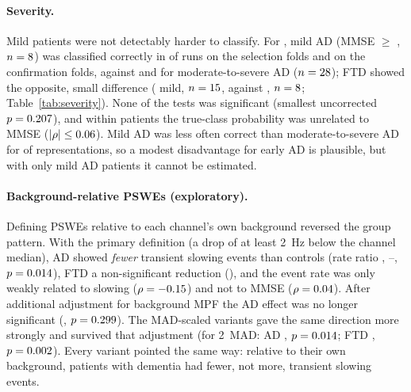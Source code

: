 \paragraph{Severity.} Mild patients were not detectably harder to classify. For \bestCell{}, mild AD
(MMSE $\ge$ \sevMildMin{}, $n=8$) was classified correctly in \sevSelADMildCorrect{} of runs on the
selection folds and \sevConfADMildCorrect{} on the confirmation folds, against \sevSelADModCorrect{} and
\sevConfADModCorrect{} for moderate-to-severe AD ($n=28$); FTD showed the opposite, small difference
(\sevSelFTDMildCorrect{} mild, $n=15$, against \sevSelFTDModCorrect{}, $n=8$;
Table~\ref{tab:severity}). None of the \sevNTests{} tests was significant (smallest uncorrected $p=0.207$),
and within patients the true-class probability was unrelated to MMSE ($|\rho|\le0.06$). Mild AD was
less often correct than moderate-to-severe AD for \sevRepADNMildWorse{} of \sevRepADNReps{} representations,
so a modest disadvantage for early AD is plausible, but with only \sevSelADMildN{} mild AD patients it cannot be estimated.

\paragraph{Background-relative PSWEs (exploratory).} Defining PSWEs relative to each channel's own
background reversed the group pattern. With the primary definition (a drop of at least \SI{2}{\hertz}
below the channel median), AD showed \emph{fewer} transient slowing events than controls (rate ratio
\reldropTwoAdjADRR{}, \reldropTwoAdjADLo{}--\reldropTwoAdjADHi{}, $p=0.014$), FTD a
non-significant reduction (\reldropTwoAdjFTDRR{}), and the event rate was only weakly related to
slowing ($\rho=-0.15$) and not to MMSE ($\rho=0.04$). After additional
adjustment for background MPF the AD effect was no longer significant (\reldropTwoAdjBgADRR{},
$p=0.299$). The MAD-scaled variants gave the same direction more strongly and survived
that adjustment (for 2~MAD: AD \relmadTwoAdjBgADRR{}, $p=0.014$; FTD \relmadTwoAdjBgFTDRR{},
$p=0.002$). Every variant pointed the same way: relative to their own background,
patients with dementia had fewer, not more, transient slowing events.

\renewcommand{\thefigure}{S\arabic{figure}}\setcounter{figure}{0}
\renewcommand{\thetable}{S\arabic{table}}\setcounter{table}{0}
\renewcommand{\theHfigure}{S\arabic{figure}}\renewcommand{\theHtable}{S\arabic{table}}   %

